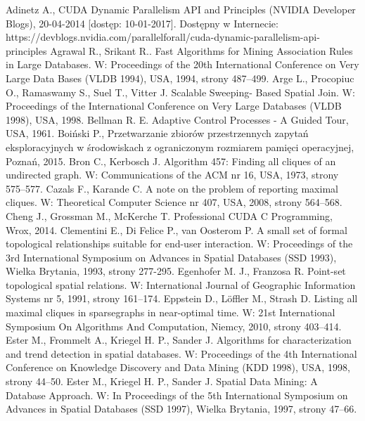 \documentclass[12pt]{article}
\begin{document}
\begin{thebibliography}{}
Adinetz A., CUDA Dynamic Parallelism API and Principles (NVIDIA Developer Blogs), 20-04-2014 [dostęp: 10-01-2017]. Dostępny w Internecie: https://devblogs.nvidia.com/parallelforall/cuda-dynamic-parallelism-api-principles
Agrawal R., Srikant R.. Fast Algorithms for Mining Association Rules in Large Databases. W: Proceedings of the 20th International Conference on Very Large Data Bases (VLDB 1994), USA, 1994, strony 487–499.
Arge L., Procopiuc O., Ramaswamy S., Suel T., Vitter J. Scalable Sweeping- Based Spatial Join. W: Proceedings of the International Conference on Very Large Databases (VLDB 1998), USA, 1998.
Bellman R. E. Adaptive Control Processes - A Guided Tour, USA, 1961.
Boiński P., Przetwarzanie zbiorów przestrzennych zapytań eksploracyjnych w środowiskach z ograniczonym rozmiarem pamięci operacyjnej, Poznań, 2015.
Bron C., Kerbosch J. Algorithm 457: Finding all cliques of an undirected graph. W: Communications of the ACM nr 16, USA, 1973, strony 575–577.
Cazals F., Karande C. A note on the problem of reporting maximal cliques. W: Theoretical Computer Science nr 407, USA, 2008, strony 564–568.
Cheng J., Grossman M., McKerche T. Professional CUDA C Programming, Wrox, 2014.
Clementini E., Di Felice P., van Oosterom P. A small set of formal topological relationships suitable for end-user interaction. W: Proceedings of the 3rd International Symposium on Advances in Spatial Databases (SSD 1993), Wielka Brytania, 1993, strony 277-295.
Egenhofer M. J., Franzosa R. Point-set topological spatial relations. W: International Journal of Geographic Information Systems nr 5, 1991, strony 161–174.
Eppstein D., Löffler M., Strash D. Listing all maximal cliques in sparsegraphs in near-optimal time. W: 21st International Symposium On Algorithms And Computation, Niemcy, 2010, strony 403–414.
Ester M., Frommelt A., Kriegel H. P., Sander J. Algorithms for characterization and trend detection in spatial databases. W: Proceedings of the 4th International Conference on Knowledge Discovery and Data Mining (KDD 1998), USA, 1998, strony 44–50.
Ester M., Kriegel H. P., Sander J. Spatial Data Mining: A Database Approach. W: In Proceedings of the 5th International Symposium on Advances in Spatial Databases (SSD 1997), Wielka Brytania, 1997, strony 47–66.

\end{thebibliography}
\end{document}
